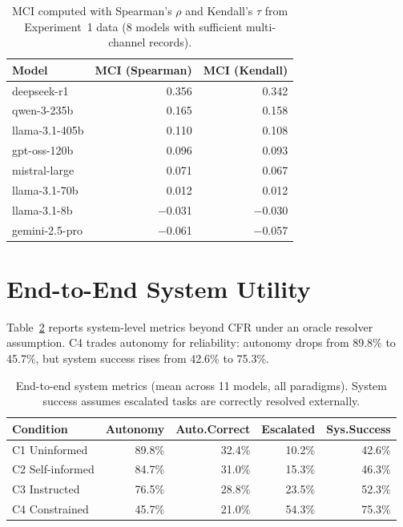 \documentclass[10pt]{article}
\begin{document}
\begin{table}[h]
\centering
\caption{MCI computed with Spearman's $\rho$ and Kendall's $\tau$ from Experiment~1 data (8 models with sufficient multi-channel records).}
\label{tab:mci-robustness}
\small
\begin{tabular}{lrr}
\toprule
Model & MCI (Spearman) & MCI (Kendall) \\
\midrule
deepseek-r1 & 0.356 & 0.342 \\
qwen-3-235b & 0.165 & 0.158 \\
llama-3.1-405b & 0.110 & 0.108 \\
gpt-oss-120b & 0.096 & 0.093 \\
mistral-large & 0.071 & 0.067 \\
llama-3.1-70b & 0.012 & 0.012 \\
llama-3.1-8b & $-$0.031 & $-$0.030 \\
gemini-2.5-pro & $-$0.061 & $-$0.057 \\
\bottomrule
\end{tabular}
\end{table}

\section{End-to-End System Utility}
\label{app:e2e}

Table~\ref{tab:e2e} reports system-level metrics beyond CFR under an oracle
resolver assumption. C4 trades autonomy for reliability: autonomy drops from
89.8\% to 45.7\%, but system success rises from 42.6\% to 75.3\%.

\begin{table}[h]
\centering
\caption{End-to-end system metrics (mean across 11 models, all paradigms). System success assumes escalated tasks are correctly resolved externally.}
\label{tab:e2e}
\small
\begin{tabular}{lrrrr}
\toprule
Condition & Autonomy & Auto.Correct & Escalated & Sys.Success \\
\midrule
C1 Uninformed & 89.8\% & 32.4\% & 10.2\% & 42.6\% \\
C2 Self-informed & 84.7\% & 31.0\% & 15.3\% & 46.3\% \\
C3 Instructed & 76.5\% & 28.8\% & 23.5\% & 52.3\% \\
C4 Constrained & 45.7\% & 21.0\% & 54.3\% & 75.3\% \\
\bottomrule
\end{tabular}
\end{table}
\end{document}
